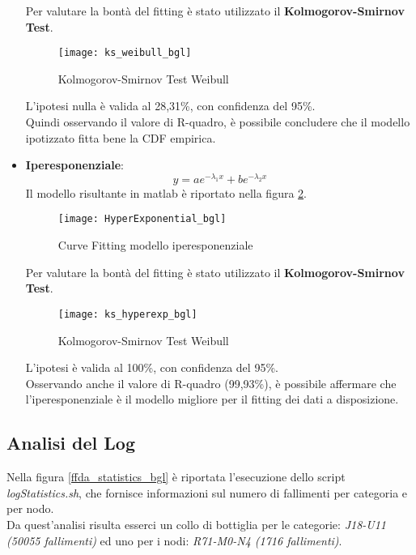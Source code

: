 \begin{itemize}
  Per valutare la bontà del fitting è stato utilizzato il \textbf{Kolmogorov-Smirnov Test}.\\

  \begin{figure}[!htbp]
    \centering
    \texttt{[image: ks\_weibull\_bgl]}
    \caption{Kolmogorov-Smirnov Test Weibull}
    \label{ffda_ks_weibull_bgl}
  \end{figure}

  L'ipotesi nulla è valida al 28,31\%, con confidenza del 95\%.\\
  Quindi osservando il valore di R-quadro, è possibile concludere che il
  modello ipotizzato fitta bene la CDF empirica.\\

  \clearpage

  \item \textbf{Iperesponenziale}:
  $$ y = a e^{- \lambda_1  x} +  b  e^{- \lambda_2  x} $$
  Il modello risultante in matlab è riportato nella figura \ref{ffda_HyperExponential_bgl}.\\

  \begin{figure}[!htbp]
    \centering
    \texttt{[image: HyperExponential\_bgl]}
    \caption{Curve Fitting modello iperesponenziale}
    \label{ffda_HyperExponential_bgl}
  \end{figure}

  Per valutare la bontà del fitting è stato utilizzato il \textbf{Kolmogorov-Smirnov Test}.\\

  \begin{figure}[!htbp]
    \centering
    \texttt{[image: ks\_hyperexp\_bgl]}
    \caption{Kolmogorov-Smirnov Test Weibull}
    \label{ffda_ks_hyperexp_bgl}
  \end{figure}

  L'ipotesi è valida al 100\%, con confidenza del 95\%.\\
  Osservando anche il valore di R-quadro (99,93\%), è possibile affermare che
  l'iperesponenziale è il modello migliore per il fitting dei dati a disposizione.\\

  \clearpage
\end{itemize}

\clearpage

\subsection{Analisi del Log}
Nella figura \ref{ffda_statistics_bgl} è riportata l'esecuzione dello script
\textit{logStatistics.sh}, che fornisce informazioni sul numero di fallimenti
per categoria e per nodo.\\
Da quest'analisi risulta esserci un collo di bottiglia per le categorie:
\textit{J18-U11 (50055 fallimenti)} ed uno per i nodi: \textit{R71-M0-N4 (1716 fallimenti)}.\\

